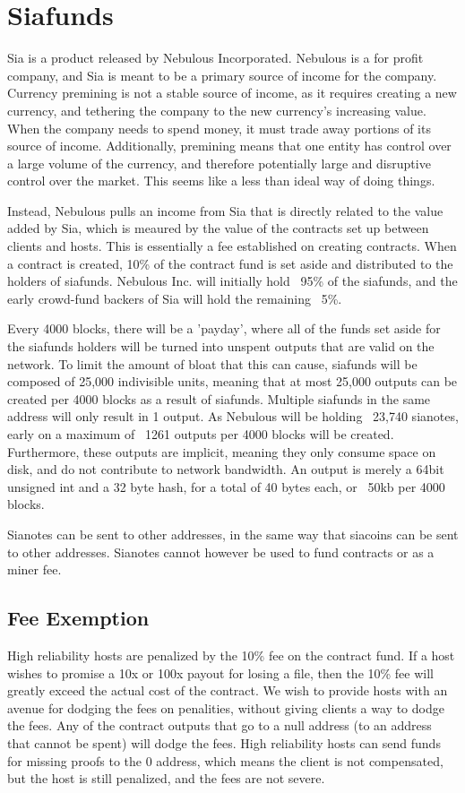 \documentclass[twocolumn]{article}
\begin{document}
\section{Siafunds}
Sia is a product released by Nebulous Incorporated.
Nebulous is a for profit company, and Sia is meant to be a primary source of income for the company.
Currency premining is not a stable source of income, as it requires creating a new currency, and tethering the company to the new currency's increasing value.
When the company needs to spend money, it must trade away portions of its source of income.
Additionally, premining means that one entity has control over a large volume of the currency, and therefore potentially large and disruptive control over the market.
This seems like a less than ideal way of doing things.

Instead, Nebulous pulls an income from Sia that is directly related to the value added by Sia, which is meaured by the value of the contracts set up between clients and hosts.
This is essentially a fee established on creating contracts.
When a contract is created, 10\% of the contract fund is set aside and distributed to the holders of siafunds.
Nebulous Inc. will initially hold ~95\% of the siafunds, and the early crowd-fund backers of Sia will hold the remaining ~5\%.

Every 4000 blocks, there will be a 'payday', where all of the funds set aside for the siafunds holders will be turned into unspent outputs that are valid on the network.
To limit the amount of bloat that this can cause, siafunds will be composed of 25,000 indivisible units, meaning that at most 25,000 outputs can be created per 4000 blocks as a result of siafunds.
Multiple siafunds in the same address will only result in 1 output.
As Nebulous will be holding ~23,740 sianotes, early on a maximum of ~1261 outputs per 4000 blocks will be created.
Furthermore, these outputs are implicit, meaning they only consume space on disk, and do not contribute to network bandwidth.
An output is merely a 64bit unsigned int and a 32 byte hash, for a total of 40 bytes each, or ~50kb per 4000 blocks.

Sianotes can be sent to other addresses, in the same way that siacoins can be sent to other addresses.
Sianotes cannot however be used to fund contracts or as a miner fee.

\subsection{Fee Exemption}
High reliability hosts are penalized by the 10\% fee on the contract fund.
If a host wishes to promise a 10x or 100x payout for losing a file, then the 10\% fee will greatly exceed the actual cost of the contract.
We wish to provide hosts with an avenue for dodging the fees on penalities, without giving clients a way to dodge the fees.
Any of the contract outputs that go to a null address (to an address that cannot be spent) will dodge the fees.
High reliability hosts can send funds for missing proofs to the 0 address, which means the client is not compensated, but the host is still penalized, and the fees are not severe.
\end{document}

